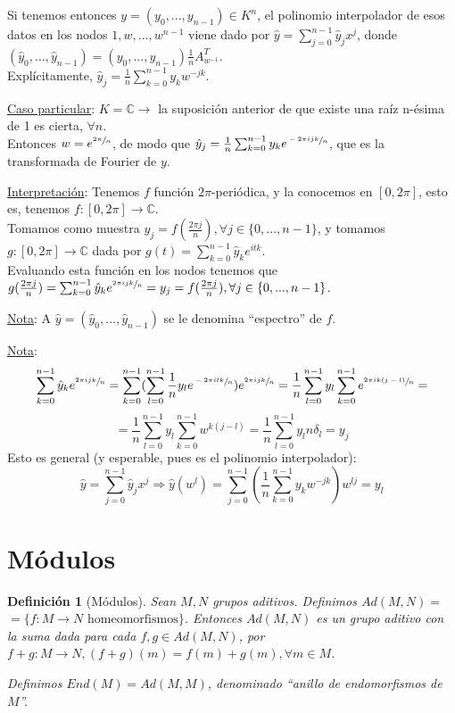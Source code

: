 \documentclass[11pt,a4paper]{article}
\theoremstyle{break}
\newtheorem{definition}[theorem]{Definición}
\begin{document}
Si tenemos entonces $y = (y_{0}, ..., y_{n-1}) \in K^{n}$, el polinomio interpolador de esos datos en los nodos $1, w, ..., w^{n-1}$ viene dado por $\hat{y} = \sum_{j = 0}^{n-1} \hat{y}_{j}x^{j}$, donde $(\hat{y}_{0}, ..., \hat{y}_{n-1}) = (y_{0}, ..., y_{n-1}) \frac{1}{n} A_{w^{-1}}^{T}$. \\
Explícitamente, $\hat{y}_{j} = \frac{1}{n} \sum_{k=0}^{n-1} y_{k} w^{-jk}$.

\underline{Caso particular}: $K = \mathbb{C} \rightarrow$ la suposición anterior de que existe una raíz n-ésima de 1 es cierta, $\forall n$. \\
Entonces $w = e^{\sfrac{2\pi}{n}}$, de modo que $\hat{y}_{j} = \frac{1}{n} \sum_{k=0}^{n-1} y_{k} e^{\sfrac{-2\pi ijk}{n}}$, que es la transformada de Fourier de $y$.

\underline{Interpretación}: Tenemos $f$ función $2\pi$-periódica, y la conocemos en $[0, 2\pi]$, esto es, tenemos $f:[0, 2\pi] \to \mathbb{C}$. \\
Tomamos como muestra $y_{j} = f(\frac{2\pi j}{n}), \forall j \in \{0, ..., n-1\}$, y tomamos $g: [0, 2\pi] \to \mathbb{C}$ dada por $g(t) = \sum_{k=0}^{n-1} \hat{y}_{k}e^{itk}$. \\
Evaluando esta función en los nodos tenemos que $g(\frac{2\pi j}{n}) = \sum_{k=0}^{n-1} \hat{y}_{k} e^{\sfrac{2\pi ijk}{n}} = y_{j} = f(\frac{2\pi j}{n}), \forall j \in \{0, ..., n-1\}$.

\underline{Nota}: A $\hat{y} = (\hat{y}_{0}, ..., \hat{y}_{n-1})$ se le denomina ``espectro'' de $f$.

\underline{Nota}:
$$\sum_{k=0}^{n-1} \hat{y}_{k} e^{\sfrac{2\pi ijk}{n}} = \sum_{k=0}^{n-1} (\sum_{l=0}^{n-1} \frac{1}{n} y_{l} e^{\sfrac{-2\pi ilk}{n}}) e^{\sfrac{2\pi ijk}{n}} = \frac{1}{n} \sum_{l=0}^{n-1} y_{l} \sum_{k=0}^{n-1} e^{\sfrac{2\pi ik(j-l)}{n}} =$$
$$= \frac{1}{n} \sum_{l=0}^{n-1} y_{l} \sum_{k=0}^{n-1} w^{k(j-l)} = \frac{1}{n} \sum_{l=0}^{n-1} y_{l} n \delta_{l} = y_{j}$$
Esto es general (y esperable, pues es el polinomio interpolador):
$$\hat{y} = \sum_{j=0}^{n-1} \hat{y}_{j} x^{j} \Rightarrow \hat{y} (w^{l}) = \sum_{j=0}^{n-1} (\frac{1}{n} \sum_{k=0}^{n-1} y_{k} w^{-jk}) w^{lj} = y_{l}$$

\newpage

\section{Módulos}

\begin{definition}[Módulos]
Sean $M, N$ grupos aditivos. Definimos $Ad(M,N) =$ \\ $=\{f: M \to N \text{ homeomorfismos}\}$. Entonces $Ad(M, N)$ es un grupo aditivo con la suma dada para cada $f, g \in Ad(M, N)$, por $f+g: M \to N, (f + g)(m) = f(m) + g(m), \forall m \in M$.

Definimos $End(M) = Ad(M,M)$, denominado ``anillo de endomorfismos de $M$''.
\end{definition}
\end{document}
